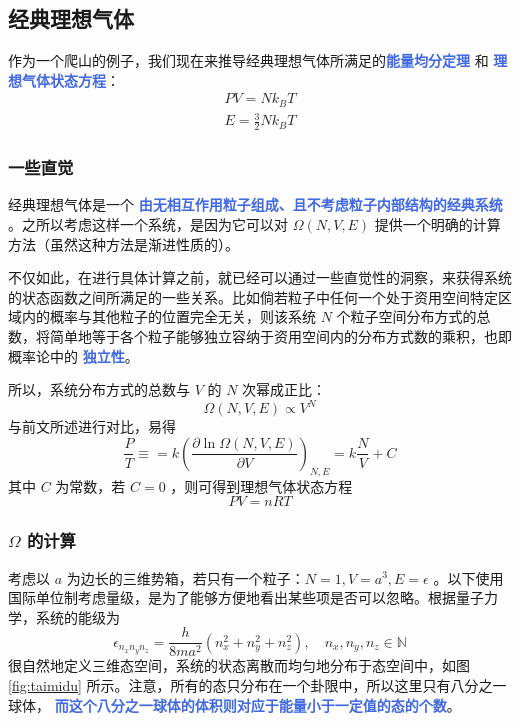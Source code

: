 \documentclass[hyperref,UTF-8]{ctexart}
\newcommand{\0}{\boldsymbol{0}}
\begin{document}
\subsection{经典理想气体}

作为一个爬山的例子，我们现在来推导经典理想气体所满足的\textcolor{RoyalBlue}{\textbf{\kaishu 能量均分定理}} 和 \textcolor{RoyalBlue}{\textbf{\kaishu 理想气体状态方程}}：
\begin{align*}
    PV = Nk_BT \\
    E = \frac{3}{2}N k_B T
\end{align*}

\subsubsection{一些直觉}\label{intuition}

经典理想气体是一个 \textcolor{RoyalBlue}{\textbf{\kaishu 由无相互作用粒子组成、且不考虑粒子内部结构的经典系统}} 。之所以考虑这样一个系统，是因为它可以对 $\Omega(N,V,E)$ 提供一个明确的计算方法（虽然这种方法是渐进性质的）。 

不仅如此，在进行具体计算之前，就已经可以通过一些直觉性的洞察，来获得系统的状态函数之间所满足的一些关系。比如倘若粒子中任何一个处于资用空间特定区域内的概率与其他粒子的位置完全无关，则该系统  $N$ 个粒子空间分布方式的总数，将简单地等于各个粒子能够独立容纳于资用空间内的分布方式数的乘积，也即概率论中的 \textcolor{RoyalBlue}{\textbf{\kaishu 独立性}}。

所以，系统分布方式的总数与 $V$ 的 $N$ 次幂成正比：
\begin{equation}
    \Omega(N,V,E) \propto V^N
\end{equation}
与前文所述进行对比，易得
\begin{equation}
    \frac{P}{T} \equiv = k \left(\frac{\partial \ln\Omega(N,V,E)}{\partial V}\right)_{N,E} = k\frac{N}{V} + C
\end{equation}
其中 $C$ 为常数，若 $C= 0$ ，则可得到理想气体状态方程
\begin{equation}
    PV = nRT
\end{equation}

\subsubsection{$\Omega$ 的计算}

考虑以 $a$ 为边长的三维势箱，若只有一个粒子：$N =1,V = a^3, E = \epsilon$ 。以下使用国际单位制考虑量级，是为了能够方便地看出某些项是否可以忽略。根据量子力学，系统的能级为
\begin{equation}
    \epsilon_{n_xn_yn_z} = \frac{h}{8ma^2} (n_x^2 + n_y^2 + n_z^2), \quad n_x, n_y, n_z\in \mathbb{N}
\end{equation}
很自然地定义三维态空间，系统的状态离散而均匀地分布于态空间中，如图 \ref{fig:taimidu} 所示。注意，所有的态只分布在一个卦限中，所以这里只有八分之一球体， \textcolor{RoyalBlue}{\textbf{\kaishu  而这个八分之一球体的体积则对应于能量小于一定值的态的个数}}。
\end{document}
